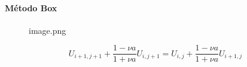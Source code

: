 \documentclass[11pt]{article}
\begin{document}
        

        
        
        
    \hypertarget{muxe9todo-box}{%
\paragraph{Método Box}}

    \begin{figure}
\centering
\caption{image.png}
\end{figure}

    \[U_{i+1,j+1} + \frac{1-\nu a}{1+\nu a}U_{i,j+1} = U_{i,j} + \frac{1-\nu a}{1+\nu a}U_{i+1,j}\]
\end{document}
